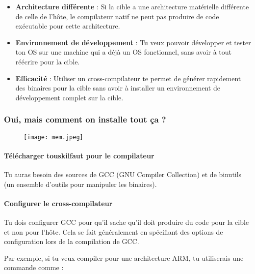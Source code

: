 \documentclass{article}
\begin{document}
\begin{itemize}
    \item \textbf{Architecture différente} : Si la cible a une architecture matérielle différente de celle de l'hôte, le compilateur natif ne peut pas produire de code exécutable pour cette architecture.
    
    \item \textbf{Environnement de développement} : Tu veux pouvoir développer et tester ton OS sur une machine qui a déjà un OS fonctionnel, sans avoir à tout réécrire pour la cible.
    
    \item \textbf{Efficacité} : Utiliser un cross-compilateur te permet de générer rapidement des binaires pour la cible sans avoir à installer un environnement de développement complet sur la cible.
\end{itemize}

\subsubsection{Oui, mais comment on installe tout ça ?}

\begin{figure}[h!] %
    \centering %
    \texttt{[image: mem.jpeg]} %
    \label{fig:logo1} %
\end{figure}
\paragraph{Télécharger touskilfaut pour le compilateur\\}
Tu auras besoin des sources de GCC (GNU Compiler Collection) et de binutils (un ensemble d'outils pour manipuler les binaires).

\paragraph{Configurer le cross-compilateur\\}
Tu dois configurer GCC pour qu'il sache qu'il doit produire du code pour la cible et non pour l'hôte. Cela se fait généralement en spécifiant des options de configuration lors de la compilation de GCC.

Par exemple, si tu veux compiler pour une architecture ARM, tu utiliserais une commande comme :
\end{document}
